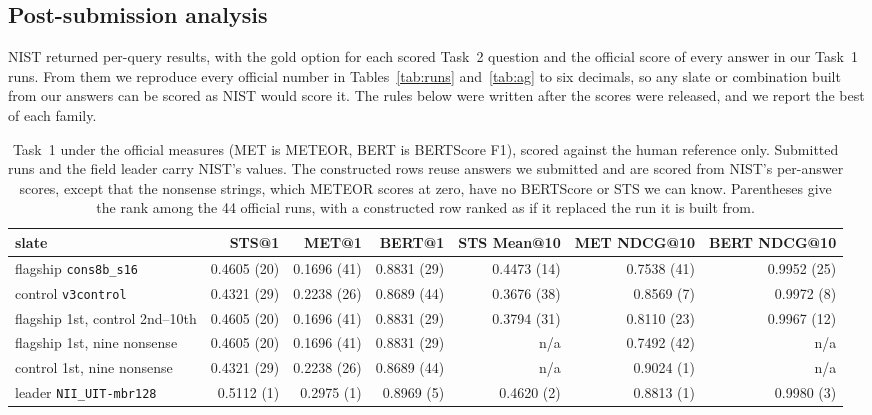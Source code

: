 \documentclass[sigconf,nonacm]{acmart}
\begin{document}
\subsection{Post-submission analysis}
\label{sec:posthoc}

NIST returned per-query results, with the gold option for each scored Task~2
question and the official score of every answer in our Task~1 runs. From them we
reproduce every official number in Tables~\ref{tab:runs} and~\ref{tab:ag} to six
decimals, so any slate or combination built from our answers can be scored as
NIST would score it. The rules below were written after the scores were released,
and we report the best of each family.

\begin{table}[t]
\caption{Task~1 under the official measures (MET is METEOR, BERT is BERTScore F1),
scored against the human reference only. Submitted runs and the field leader carry NIST's values. The constructed
rows reuse answers we submitted and are scored from NIST's per-answer scores,
except that the nonsense strings, which METEOR scores at zero, have no BERTScore
or STS we can know. Parentheses give the rank among the 44 official runs, with a
constructed row ranked as if it replaced the run it is built from.}
\label{tab:metricbias}
\footnotesize
\setlength{\tabcolsep}{4pt}
\begin{tabular}{lrrrrrr}
\toprule
slate & STS@1 & MET@1 & BERT@1 & STS Mean@10 & MET NDCG@10 & BERT NDCG@10 \\
\midrule
flagship \texttt{cons8b\_s16} & 0.4605 (20) & 0.1696 (41) & 0.8831 (29) & 0.4473 (14) & 0.7538 (41) & 0.9952 (25) \\
control \texttt{v3control} & 0.4321 (29) & 0.2238 (26) & 0.8689 (44) & 0.3676 (38) & 0.8569 (7) & 0.9972 (8) \\
flagship 1st, control 2nd--10th & 0.4605 (20) & 0.1696 (41) & 0.8831 (29) & 0.3794 (31) & 0.8110 (23) & 0.9967 (12) \\
flagship 1st, nine nonsense & 0.4605 (20) & 0.1696 (41) & 0.8831 (29) & n/a & 0.7492 (42) & n/a \\
control 1st, nine nonsense & 0.4321 (29) & 0.2238 (26) & 0.8689 (44) & n/a & 0.9024 (1) & n/a \\
\midrule
leader \texttt{NII\_UIT-mbr128} & 0.5112 (1) & 0.2975 (1) & 0.8969 (5) & 0.4620 (2) & 0.8813 (1) & 0.9980 (3) \\
\bottomrule
\end{tabular}
\end{table}
\end{document}
